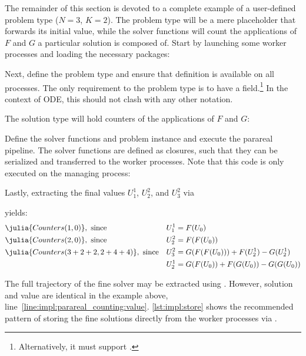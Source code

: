\def\sk{\textsuperscript{k}}
\def\skmi{\textsuperscript{k-1}}


The remainder of this section is devoted to a complete example of a user-defined problem type ($N=3$, $K=2$).
The problem type will be a mere placeholder that forwards its initial value,
while the solver functions will count the applications of $F$ and $G$ a particular solution is composed of.
Start by launching some worker processes and loading the necessary packages:

Next, define the problem type and ensure that definition is available on all processes.
The only requirement to the problem type is to have a  field.\footnote{%
  Alternatively, it must support .
}
In the context of \ac{ODE}, this should not clash with any other notation.
\addtocounter{lstnumber}{1} %

The solution type will hold counters of the applications of $F$ and $G$:

Define the solver functions and problem instance and execute the parareal pipeline.
The solver functions are defined as closures,
such that they can be serialized and transferred to the worker processes.
Note that this code is only executed on the managing process:

Lastly, extracting the final values $U_1^1$, $U_2^2$, and $U_3^2$ via

yields:
\begin{align*}
  &\julia{Counters(1,0)}, \text{ since} &
  U_1^1 &= F(U_0) \\
  &\julia{Counters(2,0)}, \text{ since} &
  U_2^2 &= F(F(U_0)) \\
  &\julia{Counters(3+2+2,2+4+4)}, \text{ since} &
  U_3^2 &= G(F(F(U_0))) + F(U_2^1) - G(U_2^1) \\
  && U_2^1 &= G(F(U_0)) + F(G(U_0)) - G(G(U_0))
\end{align*}

The full trajectory of the fine solver may be extracted using .
However, solution and value are identical in the example above,
\cf line~\ref{line:impl:parareal_counting:value}.
\autoref{lst:impl:store} shows the recommended pattern of
storing the fine solutions directly from the worker processes
via .

